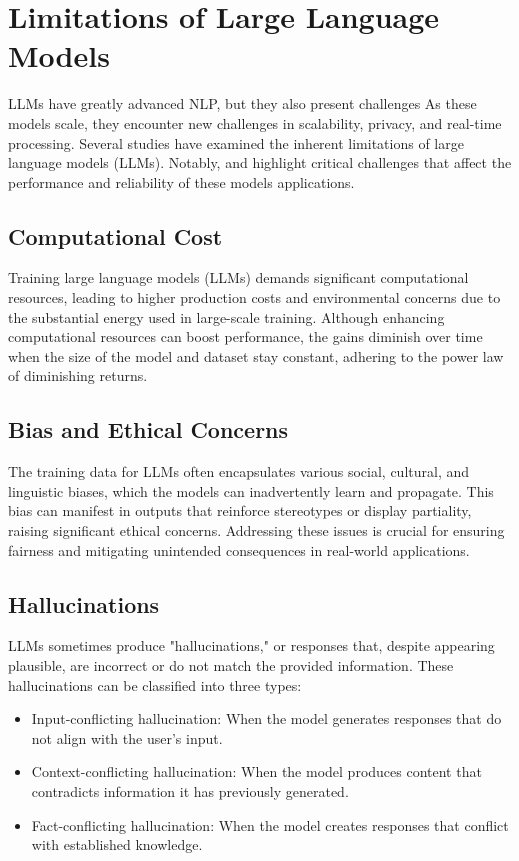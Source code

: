\section{Limitations of Large Language Models}
LLMs have greatly advanced NLP, but they also present challenges As these models scale, they encounter new challenges in scalability, privacy, and real-time processing. Several studies have examined the inherent limitations of large language models (LLMs). Notably, \cite{Bender2021} and \cite{Naveed2024} highlight critical challenges that affect the performance and reliability of these models applications.
\subsection{ Computational Cost}
Training large language models (LLMs) demands significant computational resources, leading to higher production costs and environmental concerns due to the substantial energy used in large-scale training. Although enhancing computational resources can boost performance, the gains diminish over time when the size of the model and dataset stay constant, adhering to the power law of diminishing returns.
\subsection{Bias and Ethical Concerns}
The training data for LLMs often encapsulates various social, cultural, and linguistic biases, which the models can inadvertently learn and propagate. This bias can manifest in outputs that reinforce stereotypes or display partiality, raising significant ethical concerns. Addressing these issues is crucial for ensuring fairness and mitigating unintended consequences in real-world applications.
\subsection{ Hallucinations}
LLMs sometimes produce "hallucinations," or responses that, despite appearing plausible, are incorrect or do not match the provided information. These hallucinations can be classified into three types:

\begin{itemize}
	\item Input-conflicting hallucination: When the model generates responses that do not align with the user's input.
	\item Context-conflicting hallucination: When the model produces content that contradicts information it has previously generated.
	\item Fact-conflicting hallucination: When the model creates responses that conflict with established knowledge.
\end{itemize}
